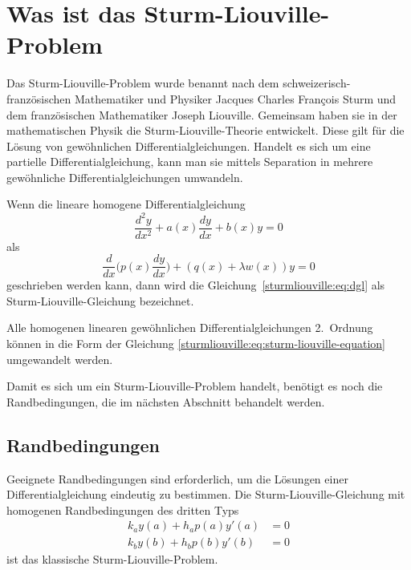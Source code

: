 %
%
%

\section{Was ist das Sturm-Liouville-Problem
\label{sturmliouville:section:teil0}}
Das Sturm-Liouville-Problem wurde benannt nach dem schweizerisch-französischen
Mathematiker und Physiker Jacques Charles Fran\c{c}ois Sturm und dem
%
%
französischen Mathematiker Joseph Liouville.
%
%
Gemeinsam haben sie in der mathematischen Physik die Sturm-Liouville-Theorie
entwickelt.
Diese gilt für die Lösung von gewöhnlichen Differentialgleichungen.
Handelt es sich um eine partielle
Differentialgleichung, kann man sie mittels Separation in
mehrere gewöhnliche Differentialgleichungen umwandeln.

\begin{definition}
Wenn die lineare homogene Differentialgleichung
\begin{equation}
	\frac{d^2y}{dx^2} + a(x)\frac{dy}{dx} + b(x)y = 0
\label{sturmliouville:eq:dgl}
\end{equation}
als
\begin{equation}
	\label{sturmliouville:eq:sturm-liouville-equation}
	\frac{d}{dx} \biggl ( p(x) \frac{dy}{dx}\biggr ) + (q(x) +
	\lambda w(x)) y
	=
	0 
\end{equation}
geschrieben werden kann, dann wird die
Gleichung~\eqref{sturmliouville:eq:dgl}
als Sturm-Liouville-Gleichung bezeichnet.
\end{definition}
Alle homogenen linearen gewöhnlichen Differentialgleichungen 2.~Ordnung können
in die Form der Gleichung \eqref{sturmliouville:eq:sturm-liouville-equation} 
umgewandelt werden.

Damit es sich um ein Sturm-Liouville-Problem handelt, benötigt es noch die
Randbedingungen, die im nächsten Abschnitt behandelt werden.

\subsection{Randbedingungen
\label{sturmliouville:sub:was-ist-das-slp-randbedingungen}}
Geeignete Randbedingungen sind erforderlich, um die Lösungen einer
Differentialgleichung eindeutig zu bestimmen.
Die Sturm-Liouville-Gleichung mit homogenen Randbedingungen des dritten Typs
\begin{equation}
	\begin{aligned}
		\label{sturmliouville:eq:randbedingungen}
		k_a y(a) + h_a p(a) y'(a) &= 0 \\
		k_b y(b) + h_b p(b) y'(b) &= 0
	\end{aligned}
\end{equation}
ist das klassische Sturm-Liouville-Problem.

